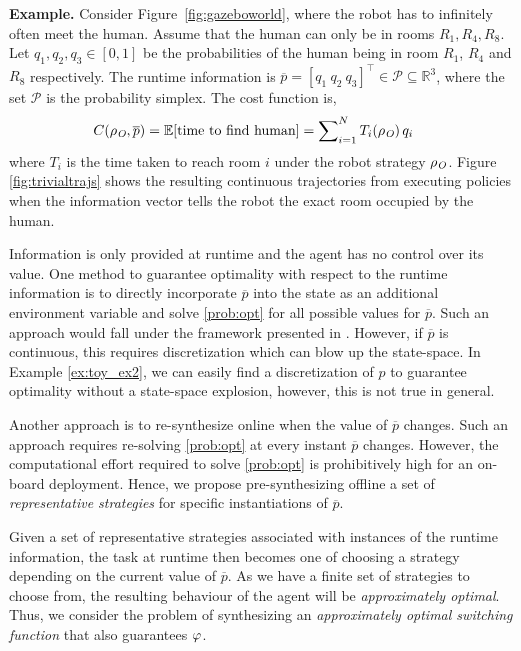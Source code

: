 \begin{itshape}
\textbf{Example.} Consider Figure~\ref{fig:gazeboworld}, where the robot has to infinitely often meet the human. Assume that the human can only be in rooms $R_1, R_4, R_8$. Let $q_1,q_2,q_3\in[0,1]$ be the probabilities of the human being in room $R_1$, $R_4$ and $R_8$ respectively. The runtime information is $\overline{p}= {[q_1\ q_2\ q_3]}^\top \in\mathcal{P}\subseteq \mathbb{R}^3$, where the set $\mathcal{P}$ is the probability simplex. The cost function is, 
\begin{align}
C(\rho_{\textit{O}}, \overline{p}) &= \mathbb E\lbrack\text{time to find human\rbrack}= \sum\nolimits_{i=1}^N T_i(\rho_{\textit{O}})\, q_i\label{eq:cost_fun}
\end{align}
where $T_i$ is the time taken to reach room $i$ under the robot strategy $\rho_{\textit{O}}$. Figure \ref{fig:trivialtrajs} shows the resulting continuous trajectories from executing policies when the information vector tells the robot the exact room occupied by the human. \label{ex:toy_ex2}
\end{itshape}


Information is only provided at runtime and the agent has no control over its value. One method to guarantee optimality with respect to the runtime information is to directly incorporate $\overline{p}$ into the state as an additional environment variable and solve \eqref{prob:opt} for all possible values for $\overline{p}$. Such an approach would fall under the framework presented in \cite{Ehlerscost}. However, if $\overline{p}$ is continuous, this requires discretization which can blow up the state-space. In Example \ref{ex:toy_ex2}, we can easily find a discretization of $p$ to guarantee optimality without a state-space explosion, however, this is not true in general.

Another approach is to re-synthesize online when the value of $\overline{p}$ changes. Such an approach requires re-solving \eqref{prob:opt} at every instant $\overline{p}$ changes. However, the computational effort required to solve \eqref{prob:opt} is prohibitively high for an on-board deployment. Hence, we propose pre-synthesizing offline a set of \emph{representative strategies} for specific instantiations of $\overline{p}$.

Given a set of representative strategies associated with instances of the runtime information, the task at runtime then becomes one of choosing a strategy depending on the current value of $\overline p$. As we have a finite set of strategies to choose from, the resulting behaviour of the agent will be \emph{approximately optimal}. Thus, we consider the problem of synthesizing an \emph{approximately optimal switching function} that also guarantees $\varphi$.

